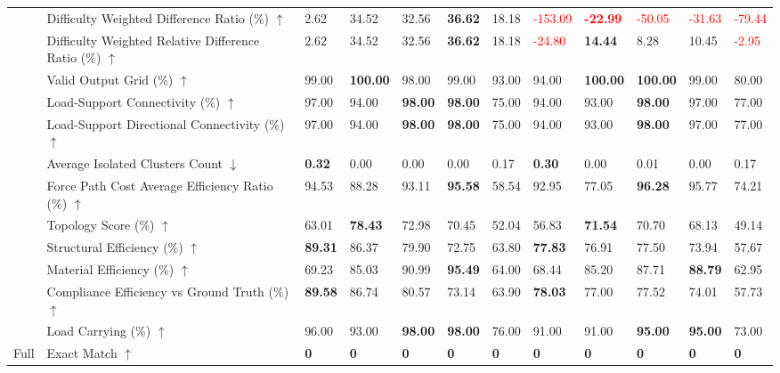 \begin{table}[!h]
{\begin{tabular}{lllllll|lllll}
 & Difficulty Weighted Difference Ratio (\%) $\uparrow$ & 2.62 & 34.52 & 32.56 & \textbf{36.62} & 18.18 & \textcolor{red}{-153.09} & \textbf{\textcolor{red}{-22.99}} & \textcolor{red}{-50.05} & \textcolor{red}{-31.63} & \textcolor{red}{-79.44} \\
 & Difficulty Weighted Relative Difference Ratio (\%) $\uparrow$ & 2.62 & 34.52 & 32.56 & \textbf{36.62} & 18.18 & \textcolor{red}{-24.80} & \textbf{14.44} & 8.28 & 10.45 & \textcolor{red}{-2.95} \\
 & Valid Output Grid (\%) $\uparrow$ & 99.00 & \textbf{100.00} & 98.00 & 99.00 & 93.00 & 94.00 & \textbf{100.00} & \textbf{100.00} & 99.00 & 80.00 \\
 & Load-Support Connectivity (\%) $\uparrow$ & 97.00 & 94.00 & \textbf{98.00} & \textbf{98.00} & 75.00 & 94.00 & 93.00 & \textbf{98.00} & 97.00 & 77.00 \\
 & Load-Support Directional Connectivity (\%) $\uparrow$ & 97.00 & 94.00 & \textbf{98.00} & \textbf{98.00} & 75.00 & 94.00 & 93.00 & \textbf{98.00} & 97.00 & 77.00 \\
 & Average Isolated Clusters Count $\downarrow$ & \textbf{0.32} & 0.00 & 0.00 & 0.00 & 0.17 & \textbf{0.30} & 0.00 & 0.01 & 0.00 & 0.17 \\
 & Force Path Cost Average Efficiency Ratio (\%) $\uparrow$ & 94.53 & 88.28 & 93.11 & \textbf{95.58} & 58.54 & 92.95 & 77.05 & \textbf{96.28} & 95.77 & 74.21 \\
 & Topology Score (\%) $\uparrow$ & 63.01 & \textbf{78.43} & 72.98 & 70.45 & 52.04 & 56.83 & \textbf{71.54} & 70.70 & 68.13 & 49.14 \\
 & Structural Efficiency (\%) $\uparrow$ & \textbf{89.31} & 86.37 & 79.90 & 72.75 & 63.80 & \textbf{77.83} & 76.91 & 77.50 & 73.94 & 57.67 \\
 & Material Efficiency (\%) $\uparrow$ & 69.23 & 85.03 & 90.99 & \textbf{95.49} & 64.00 & 68.44 & 85.20 & 87.71 & \textbf{88.79} & 62.95 \\
 & Compliance Efficiency vs Ground Truth (\%) $\uparrow$ & \textbf{89.58} & 86.74 & 80.57 & 73.14 & 63.90 & \textbf{78.03} & 77.00 & 77.52 & 74.01 & 57.73 \\
 & Load Carrying (\%) $\uparrow$ & 96.00 & 93.00 & \textbf{98.00} & \textbf{98.00} & 76.00 & 91.00 & 91.00 & \textbf{95.00} & \textbf{95.00} & 73.00 \\
\midrule
Full & Exact Match $\uparrow$ & \textbf{0} & \textbf{0} & \textbf{0} & \textbf{0} & \textbf{0} & \textbf{0} & \textbf{0} & \textbf{0} & \textbf{0} & \textbf{0} \\

\end{tabular}}
\end{table}
